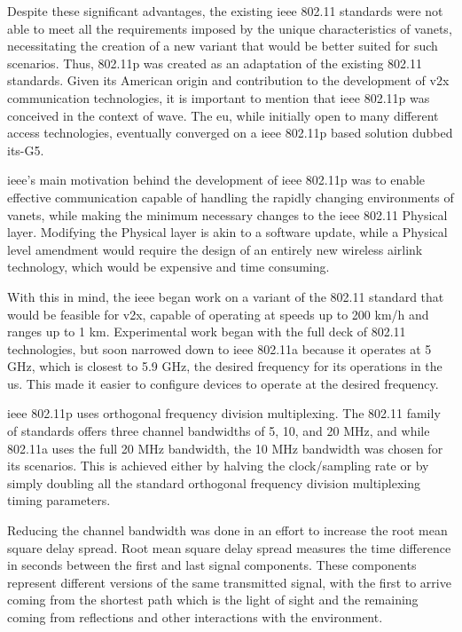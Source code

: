 Despite these significant advantages, the existing \gls{ieee} 802.11 standards were not able to meet all the requirements imposed by the unique characteristics of \glspl{vanet}, necessitating the creation of a new variant that would be better suited for such scenarios. Thus, 802.11p was created as an adaptation of the existing 802.11 standards. Given its American origin and contribution to the development of \gls{v2x} communication technologies, it is important to mention that \gls{ieee} 802.11p was conceived in the context of \gls{wave}\cite{jiang_ieee_2008}. The \gls{eu}, while initially open to many different access technologies, eventually converged on a \gls{ieee} 802.11p based solution dubbed \gls{its}-G5.

\gls{ieee}'s main motivation behind the development of \gls{ieee} 802.11p was to enable effective communication capable of handling the rapidly changing environments of \glspl{vanet}\cite{jiang_ieee_2008}, while making the minimum necessary changes to the \gls{ieee} 802.11 Physical layer. Modifying the Physical layer is akin to a software update, while a Physical level amendment would require the design of an entirely new wireless airlink technology\cite{jiang_ieee_2008}, which would be expensive and time consuming. 

With this in mind, the \gls{ieee} began work on a variant of the 802.11 standard that would be feasible for \gls{v2x}, capable of operating at speeds up to 200 km/h and ranges up to 1 km\cite{jakubiak_state_2008}. Experimental work began with the full deck of 802.11 technologies\cite{toor_vehicle_2008}, but soon narrowed down to \gls{ieee} 802.11a because it operates at 5 GHz, which is closest to 5.9 GHz, the desired frequency for \gls{its} operations in the \gls{us}. This made it easier to configure devices to operate at the desired frequency\cite{jiang_ieee_2008}.


\gls{ieee} 802.11p uses orthogonal frequency division multiplexing. The 802.11 family of standards offers three channel bandwidths of 5, 10, and 20 MHz, and while 802.11a uses the full 20 MHz bandwidth, the 10 MHz bandwidth was chosen for \gls{its} scenarios. This is achieved either by halving the clock/sampling rate or by simply doubling all the standard orthogonal frequency division multiplexing timing parameters\cite{rohde__schwarz_intelligent_2019}.

Reducing the channel bandwidth was done in an effort to increase the root mean square delay spread\cite{toor_vehicle_2008}. Root mean square delay spread measures the time difference in seconds between the first and last signal components. These components represent different versions of the same transmitted signal, with the first to arrive coming from the shortest path which is the light of sight and the remaining coming from reflections and other interactions with the environment.

